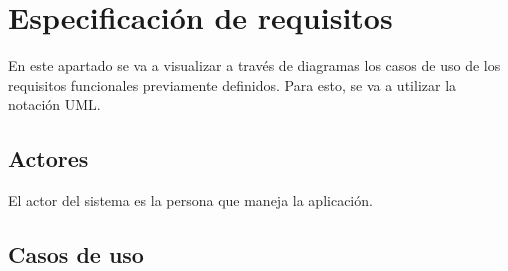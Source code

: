 \section{Especificación de requisitos}

En este apartado se va a visualizar a través de diagramas los casos de uso de los requisitos funcionales previamente deﬁnidos. Para esto, se va a utilizar la notación UML.

\subsection{Actores}

El actor del sistema es la persona que maneja la aplicación.

\subsection{Casos de uso}




